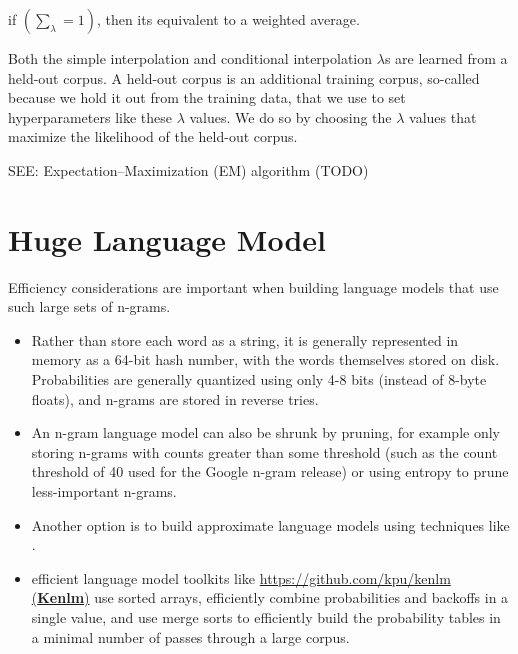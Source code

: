 if \( \left( \sum_\lambda = 1 \right)\), then its equivalent to a weighted average.

Both the simple interpolation and conditional interpolation $\lambda$s are learned from a held-out corpus. A held-out corpus is an additional training corpus, so-called because we hold it out from the training data, that we use to set hyperparameters like these $\lambda$ values. We do so by choosing the $\lambda$ values that maximize the likelihood of the held-out corpus.

SEE: Expectation–Maximization (EM) algorithm (TODO)


\section{Huge Language Model}
Efficiency considerations are important when building language models that use such large sets of n-grams. 
\begin{itemize}
    \item Rather than store each word as a string, it is generally represented in memory as a 64-bit hash number, with the words themselves stored on disk. Probabilities are generally quantized using only 4-8 bits (instead of 8-byte floats), and n-grams are stored in reverse tries.
    \item An n-gram language model can also be shrunk by pruning, for example only storing n-grams with counts greater than some threshold (such as the count threshold of 40 used for the Google n-gram release) or using entropy to prune less-important n-grams.
    \item Another option is to build approximate language models using techniques like .
    \item efficient language model toolkits like \href{https://github.com/kpu/kenlm}{https://github.com/kpu/kenlm (\textbf{Kenlm})} use sorted arrays, efficiently combine probabilities and backoffs in a single value, and use merge sorts to efficiently build the probability tables in a minimal number of passes through a large corpus.
\end{itemize}












































